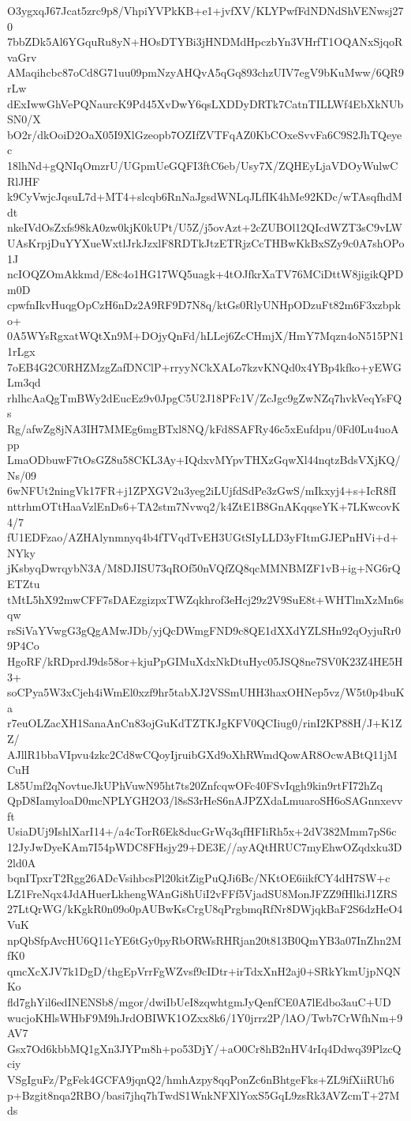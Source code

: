 O3ygxqJ67Jcat5zrc9p8/VhpiYVPkKB+e1+jvfXV/KLYPwfFdNDNdShVENwsj270
7bbZDk5Al6YGquRu8yN+HOsDTYBi3jHNDMdHpczbYn3VHrfT1OQANxSjqoRvaGrv
AMaqihcbc87oCd8G71uu09pmNzyAHQvA5qGq893chzUIV7egV9bKuMww/6QR9rLw
dExIwwGhVePQNaurcK9Pd45XvDwY6qsLXDDyDRTk7CatnTILLWf4EbXkNUbSN0/X
bO2r/dkOoiD2OaX05I9XlGzeopb7OZIfZVTFqAZ0KbCOxeSvvFa6C9S2JhTQeyec
18lhNd+gQNIqOmzrU/UGpmUeGQFI3ftC6eb/Usy7X/ZQHEyLjaVDOyWulwCRlJHF
k9CyVwjcJqsuL7d+MT4+slcqb6RnNaJgsdWNLqJLfIK4hMe92KDc/wTAsqfhdMdt
nkeIVdOsZxfs98kA0zw0kjK0kUPt/U5Z/j5ovAzt+2cZUBOl12QIcdWZT3sC9vLW
UAsKrpjDuYYXueWxtlJrkJzxlF8RDTkJtzETRjzCcTHBwKkBxSZy9c0A7shOPo1J
ncIOQZOmAkkmd/E8c4o1HG17WQ5uagk+4tOJfkrXaTV76MCiDttW8jigikQPDm0D
cpwfnIkvHuqgOpCzH6nDz2A9RF9D7N8q/ktGs0RlyUNHpODzuFt82m6F3xzbpko+
0A5WYsRgxatWQtXn9M+DOjyQnFd/hLLej6ZcCHmjX/HmY7Mqzn4oN515PN11rLgx
7oEB4G2C0RHZMzgZafDNClP+rryyNCkXALo7kzvKNQd0x4YBp4kfko+yEWGLm3qd
rhlhcAaQgTmBWy2dEucEz9v0JpgC5U2J18PFc1V/ZcJgc9gZwNZq7hvkVeqYsFQs
Rg/afwZg8jNA3IH7MMEg6mgBTxl8NQ/kFd8SAFRy46c5xEufdpu/0Fd0Lu4uoApp
LmaODbuwF7tOsGZ8u58CKL3Ay+IQdxvMYpvTHXzGqwXl44nqtzBdsVXjKQ/Ns/09
6wNFUt2ningVk17FR+j1ZPXGV2u3yeg2iLUjfdSdPe3zGwS/mIkxyj4+s+IcR8fI
nttrhmOTtHaaVzlEnDs6+TA2stm7Nvwq2/k4ZtE1B8GnAKqqseYK+7LKwcovK4/7
fU1EDFzao/AZHAlynmnyq4b4fTVqdTvEH3UGtSIyLLD3yFItmGJEPnHVi+d+NYky
jKsbyqDwrqybN3A/M8DJISU73qROf50nVQfZQ8qcMMNBMZF1vB+ig+NG6rQETZtu
tMtL5hX92mwCFF7sDAEzgizpxTWZqkhrof3eHcj29z2V9SuE8t+WHTlmXzMn6sqw
rsSiVaYVwgG3gQgAMwJDb/yjQcDWmgFND9c8QE1dXXdYZLSHn92qOyjuRr09P4Co
HgoRF/kRDprdJ9ds58or+kjuPpGIMuXdxNkDtuHyc05JSQ8ne7SV0K23Z4HE5H3+
soCPya5W3xCjeh4iWmEl0xzf9hr5tabXJ2VSSmUHH3haxOHNep5vz/W5t0p4buKa
r7euOLZacXH1SanaAnCn83ojGuKdTZTKJgKFV0QCIiug0/rinI2KP88H/J+K1ZZ/
AJllR1bbaVIpvu4zkc2Cd8wCQoyIjruibGXd9oXhRWmdQowAR8OcwABtQ11jMCuH
L85Umf2qNovtueJkUPhVuwN95ht7ts20ZnfcqwOFc40FSvIqgh9kin9rtFI72hZq
QpD8IamyloaD0mcNPLYGH2O3/l8sS3rHeS6nAJPZXdaLmuaroSH6oSAGnnxevvft
UsiaDUj9IshlXarI14+/a4cTorR6Ek8ducGrWq3qfHFIiRh5x+2dV382Mmm7pS6c
12JyJwDyeKAm7I54pWDC8FHsjy29+DE3E//ayAQtHRUC7myEhwOZqdxku3D2ld0A
bqnITpxrT2Rgg26ADcVsihbcsPl20kitZigPuQJi6Bc/NKtOE6iikfCY4dH7SW+c
LZ1FreNqx4JdAHuerLkhengWAnGi8hUiI2vFFf5VjadSU8MonJFZZ9fHlkiJ1ZRS
27LtQrWG/kKgkR0n09o0pAUBwKsCrgU8qPrgbmqRfNr8DWjqkBaF2S6dzHeO4VuK
npQbSfpAvcHU6Q11cYE6tGy0pyRbORWsRHRjan20t813B0QmYB3a07InZhn2MfK0
qmcXcXJV7k1DgD/thgEpVrrFgWZvsf9cIDtr+irTdxXnH2aj0+SRkYkmUjpNQNKo
fld7ghYil6edINENSb8/mgor/dwiIbUeI8zqwhtgmJyQenfCE0A7lEdbo3auC+UD
wucjoKHlsWHbF9M9hJrdOBIWK1OZxx8k6/1Y0jrrz2P/lAO/Twb7CrWfhNm+9AV7
Gsx7Od6kbbMQ1gXn3JYPm8h+po53DjY/+aO0Cr8hB2nHV4rIq4Ddwq39PlzcQciy
VSgIguFz/PgFek4GCFA9jqnQ2/hmhAzpy8qqPonZc6nBhtgeFks+ZL9ifXiiRUh6
p+Bzgit8nqa2RBO/basi7jhq7hTwdS1WnkNFXlYoxS5GqL9zsRk3AVZcmT+27Mds

